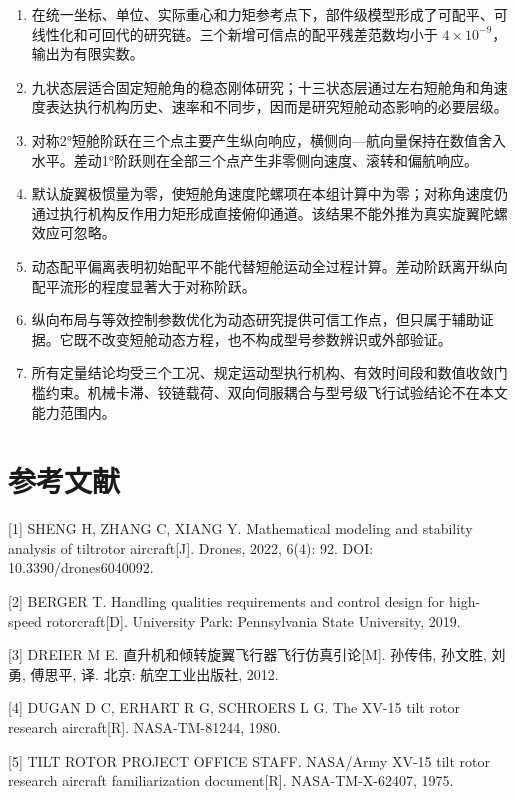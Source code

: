 \begin{enumerate}
\def\labelenumi{\arabic{enumi}.}
\tightlist
\item
  在统一坐标、单位、实际重心和力矩参考点下，部件级模型形成了可配平、可线性化和可回代的研究链。三个新增可信点的配平残差范数均小于
  \(4\times10^{-9}\)，输出为有限实数。
\item
  九状态层适合固定短舱角的稳态刚体研究；十三状态层通过左右短舱角和角速度表达执行机构历史、速率和不同步，因而是研究短舱动态影响的必要层级。
\item
  对称2°短舱阶跃在三个点主要产生纵向响应，横侧向---航向量保持在数值舍入水平。差动1°阶跃则在全部三个点产生非零侧向速度、滚转和偏航响应。
\item
  默认旋翼极惯量为零，使短舱角速度陀螺项在本组计算中为零；对称角速度仍通过执行机构反作用力矩形成直接俯仰通道。该结果不能外推为真实旋翼陀螺效应可忽略。
\item
  动态配平偏离表明初始配平不能代替短舱运动全过程计算。差动阶跃离开纵向配平流形的程度显著大于对称阶跃。
\item
  纵向布局与等效控制参数优化为动态研究提供可信工作点，但只属于辅助证据。它既不改变短舱动态方程，也不构成型号参数辨识或外部验证。
\item
  所有定量结论均受三个工况、规定运动型执行机构、有效时间段和数值收敛门槛约束。机械卡滞、铰链载荷、双向伺服耦合与型号级飞行试验结论不在本文能力范围内。
\end{enumerate}

\chapter{参考文献}\label{ux53c2ux8003ux6587ux732e}

{[}1{]} SHENG H, ZHANG C, XIANG Y. Mathematical modeling and stability
analysis of tiltrotor aircraft{[}J{]}. Drones, 2022, 6(4): 92. DOI:
10.3390/drones6040092.

{[}2{]} BERGER T. Handling qualities requirements and control design for
high-speed rotorcraft{[}D{]}. University Park: Pennsylvania State
University, 2019.

{[}3{]} DREIER M E. 直升机和倾转旋翼飞行器飞行仿真引论{[}M{]}. 孙传伟,
孙文胜, 刘勇, 傅思平, 译. 北京: 航空工业出版社, 2012.

{[}4{]} DUGAN D C, ERHART R G, SCHROERS L G. The XV-15 tilt rotor
research aircraft{[}R{]}. NASA-TM-81244, 1980.

{[}5{]} TILT ROTOR PROJECT OFFICE STAFF. NASA/Army XV-15 tilt rotor
research aircraft familiarization document{[}R{]}. NASA-TM-X-62407,
1975.

